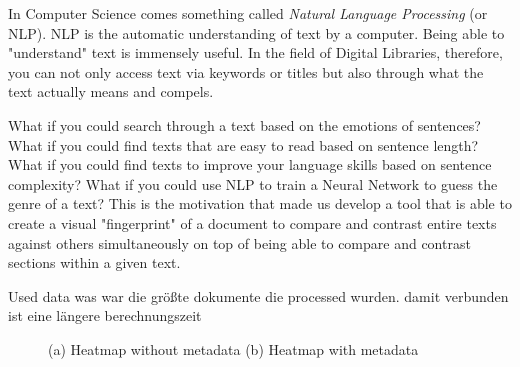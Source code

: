 \documentclass[runningheads]{llncs}
\begin{document}
In Computer Science comes something called \textit{Natural Language Processing} (or NLP). NLP is the automatic understanding of text by a computer. Being able to "understand" text is immensely useful. In the field of Digital Libraries, therefore, you can not only access text via keywords or titles but also through what the text actually means and compels.

What if you could search through a text based on the emotions of sentences? What if you could find texts that are easy to read based on sentence length? What if you could find texts to improve your language skills based on sentence complexity? What if you could use NLP to train a Neural Network to guess the genre of a text? This is the motivation that made us develop a tool that is able to create a visual "fingerprint" of a document to compare and contrast entire texts against others simultaneously on top of being able to compare and contrast sections within a given text.



Used data
was war die größte dokumente die processed wurden.
damit verbunden ist eine längere berechnungszeit

\begin{figure}
    \centering
    \caption{(a) Heatmap without metadata (b) Heatmap with metadata}
    \label{fig:foobar}
\end{figure}
\end{document}
